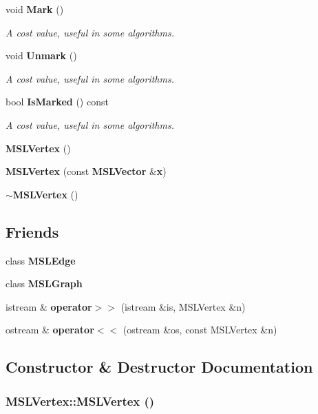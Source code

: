 \begin{CompactItemize}
void {\bf Mark} ()
\begin{CompactList}\small\item\em A cost value, useful in some algorithms.\item\end{CompactList}\item 
void {\bf Unmark} ()
\begin{CompactList}\small\item\em A cost value, useful in some algorithms.\item\end{CompactList}\item 
bool {\bf Is\-Marked} () const
\begin{CompactList}\small\item\em A cost value, useful in some algorithms.\item\end{CompactList}\item 
{\bf MSLVertex} ()
\item 
{\bf MSLVertex} (const {\bf MSLVector} \&{\bf x})
\item 
{\bf $\sim$MSLVertex} ()
\end{CompactItemize}
\subsection*{Friends}
\begin{CompactItemize}
\item 
class {\bf MSLEdge}
\item 
class {\bf MSLGraph}
\item 
istream \& {\bf operator$>$$>$} (istream \&is, MSLVertex \&n)
\item 
ostream \& {\bf operator$<$$<$} (ostream \&os, const MSLVertex \&n)
\end{CompactItemize}


\subsection{Constructor \& Destructor Documentation}
\subsubsection{\setlength{\rightskip}{0pt plus 5cm}MSLVertex::MSLVertex ()}\label{classMSLVertex_a9}


